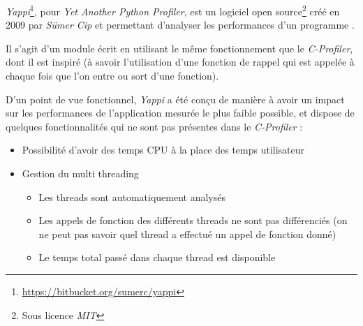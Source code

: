 \emph{Yappi}\footnote{\url{https://bitbucket.org/sumerc/yappi}}, pour \emph{Yet Another Python Profiler}, est un logiciel open source\footnote{Sous licence \emph{MIT}} créé en 2009 par \emph{Sümer Cip} et permettant d'analyser les performances d'un programme \Python.

Il s'agit d'un module écrit en \C utilisant le même fonctionnement que le \emph{C-Profiler}, dont il est inspiré (à savoir l'utilisation d'une fonction de rappel qui est appelée à chaque fois que l'on entre ou sort d'une fonction).

D'un point de vue fonctionnel, \emph{Yappi} a été conçu de manière à avoir un impact sur les performances de l'application mesurée le plus faible possible, et dispose de quelques fonctionnalités qui ne sont pas présentes dans le \emph{C-Profiler} :
\begin{itemize}
\item Possibilité d'avoir des temps CPU à la place des temps utilisateur
\item Gestion du multi threading
\begin{itemize}
\item Les threads sont automatiquement analysés
\item Les appels de fonction des différents threads ne sont pas différenciés (on ne peut pas savoir quel thread a effectué un appel de fonction donné) 
\item Le temps total passé dans chaque thread est disponible
\end{itemize}
\end{itemize}